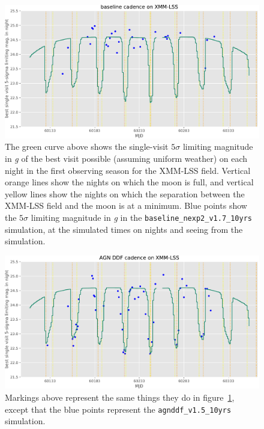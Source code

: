 \documentclass[DM,authoryear,toc]{lsstdoc}
\begin{document}
\begin{figure}
\centering
\includegraphics[width=\linewidth]{figures/baseline_nexp2_v1_7_10yrs_xmmlss.pdf}
\caption{\label{fig:baselinemaglim}
  The green curve above shows the single-visit $5\sigma$ limiting magnitude in {\it g} of the best visit possible (assuming uniform weather) on each night in the first observing season for the XMM-LSS field.
  Vertical orange lines show the nights on which the moon is full, and vertical yellow lines show the nights on which the separation between the XMM-LSS field and the moon is at a minimum.
  Blue points show the $5\sigma$ limiting magnitude in {\it g} in the \texttt{baseline\_nexp2\_v1.7\_10yrs} simulation, at the simulated times on nights and seeing from the simulation.
}
\end{figure}

\begin{figure}
\centering
\includegraphics[width=\linewidth]{figures/agnddf_v1_5_10yrs_xmmlss.pdf}
\caption{\label{fig:agnmaglim}
  Markings above represent the same things they do in figure~\ref{fig:baselinemaglim}, except that the blue points represent the \texttt{agnddf\_v1.5\_10yrs} simulation.
}
\end{figure}
\end{document}
